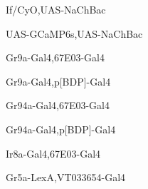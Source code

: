 \documentclass[17pt]{extarticle}
\begin{document}
\vspace*{\fill}
\newpage{}
\vspace*{\fill}\begin{small}
If/CyO,UAS-NaChBac \\[0.5em]
\end{small}
\footnotesize
\vspace*{\fill}
\newpage{}
\vspace*{\fill}\begin{footnotesize}
UAS-GCaMP6s,UAS-NaChBac \\[0.5em]
\end{footnotesize}
\footnotesize
\vspace*{\fill}
\newpage{}
\vspace*{\fill}\begin{small}
Gr9a-Gal4,67E03-Gal4 \\[0.5em]
\end{small}
\footnotesize
\vspace*{\fill}
\newpage{}
\vspace*{\fill}\begin{footnotesize}
Gr9a-Gal4,p[BDP]-Gal4 \\[0.5em]
\end{footnotesize}
\footnotesize
\vspace*{\fill}
\newpage{}
\vspace*{\fill}\begin{footnotesize}
Gr94a-Gal4,67E03-Gal4 \\[0.5em]
\end{footnotesize}
\footnotesize
\vspace*{\fill}
\newpage{}
\vspace*{\fill}\begin{footnotesize}
Gr94a-Gal4,p[BDP]-Gal4 \\[0.5em]
\end{footnotesize}
\footnotesize
\vspace*{\fill}
\newpage{}
\vspace*{\fill}\begin{small}
Ir8a-Gal4,67E03-Gal4 \\[0.5em]
\end{small}
\footnotesize
\vspace*{\fill}
\newpage{}
\vspace*{\fill}\begin{footnotesize}
Gr5a-LexA,VT033654-Gal4 \\[0.5em]
\end{footnotesize}
\end{document}
